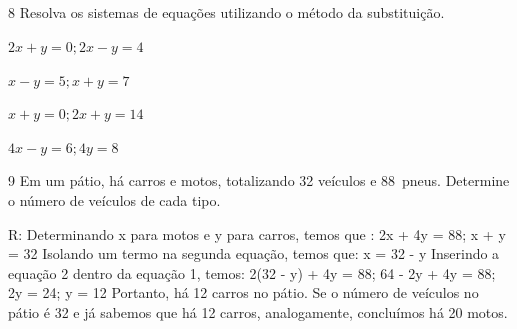 \\

\\

\\

\\

\\

\\

\\

\\

\\

\num{8} Resolva os sistemas de equações utilizando o método da substituição.


\begin{escolha}
\item $2x + y = 0; 2x - y = 4$
\item $x - y = 5; x + y = 7$
\item $x + y = 0; 2x + y = 14$
\item $4x - y = 6; 4y = 8$
\end{escolha}


\num{9} Em um pátio, há carros e motos, totalizando 32 veículos e 88~pneus.
Determine o número de veículos de cada tipo.

R: Determinando x para motos e y para carros, temos que :
2x + 4y = 88; x + y = 32
Isolando um termo na segunda equação, temos que: x = 32 - y
Inserindo a equação 2 dentro da equação 1, temos:
2(32 - y) + 4y = 88; 64 - 2y + 4y = 88; 2y = 24; y = 12
Portanto, há 12 carros no pátio.
Se o número de veículos no pátio é 32 e já sabemos que há 12 carros,
analogamente, concluímos há 20 motos.

